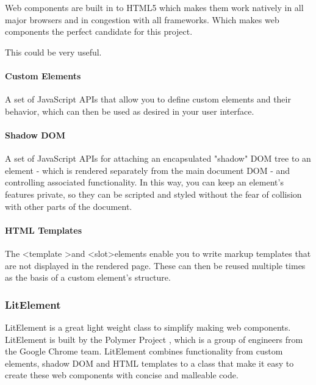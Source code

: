 Web components are built in to HTML5 which makes them work natively in all major browsers and in congestion with all frameworks. Which makes web components the perfect candidate for this project. 

This \cite{WebComponentsMDN} could be very useful.

\paragraph{Custom Elements}
\label{ssub:Custom Elements}

A set of JavaScript APIs that allow you to define custom elements and their behavior, which can then be used as desired in your user interface.


\paragraph{Shadow DOM}%
\label{ssub:Shadow DOM}
A set of JavaScript APIs for attaching an encapsulated "shadow" DOM tree to an element - which is rendered separately from the main document DOM - and controlling associated functionality. In this way, you can keep an element's features private, so they can be scripted and styled without the fear of collision with other parts of the document.

\paragraph{HTML Templates}%
\label{ssub:HMTL Templates}
The \textless template \textgreater and \textless slot\textgreater elements enable you to write markup templates that are not displayed in the rendered page. These can then be reused multiple times as the basis of a custom element's structure.

\subsubsection{LitElement}%
\label{ssub:LitElement}
LitElement is a great light weight class to simplify making web components\cite{polymerLitElement}. LitElement is built by the Polymer Project \cite{polymerPolymerProject}, which is a group of engineers from the Google Chrome team. LitElement combines functionality from custom elements, shadow DOM and HTML templates to a class that make it easy to create these web components with concise and malleable code.





